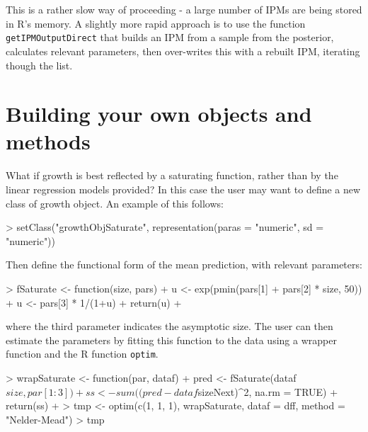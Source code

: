\documentclass{article}
\begin{document}
This is a rather slow way of proceeding - a large number of IPMs are being
stored in R's memory. A slightly more rapid approach is to use the function {\tt
getIPMOutputDirect} that builds an IPM from a sample from the posterior,
calculates relevant parameters, then over-writes this with a rebuilt IPM,
iterating though the list.


\section{Building your own objects and methods}
What if growth is best reflected by a saturating function, rather than by the
linear regression models provided?  In this case the user may want to define a
new class of growth object.  An example of this follows:
\begin{Schunk}
\begin{Sinput}
> setClass("growthObjSaturate", representation(paras = "numeric", sd = "numeric"))
\end{Sinput}
\end{Schunk}
Then define the functional form of the mean prediction, with relevant parameters: 
\begin{Schunk}
\begin{Sinput}
> fSaturate <- function(size, pars) { 
+     u <- exp(pmin(pars[1] + pars[2] * size, 50))
+     u <- pars[3] * 1/(1+u)
+     return(u)
+ }
\end{Sinput}
\end{Schunk}
where the third parameter indicates the asymptotic size. The user can then
estimate the parameters by fitting this function to the data using a wrapper
function and the R function {\tt optim}.
\begin{Schunk}
\begin{Sinput}
> wrapSaturate <- function(par, dataf) { 
+     pred <- fSaturate(dataf$size, par[1:3])
+     ss <- sum((pred - dataf$sizeNext)^2, na.rm = TRUE)
+     return(ss)
+     }
> tmp <- optim(c(1, 1, 1), wrapSaturate, dataf = dff, method = "Nelder-Mead")
> tmp    
\end{Sinput}
\end{Schunk}
\end{document}
